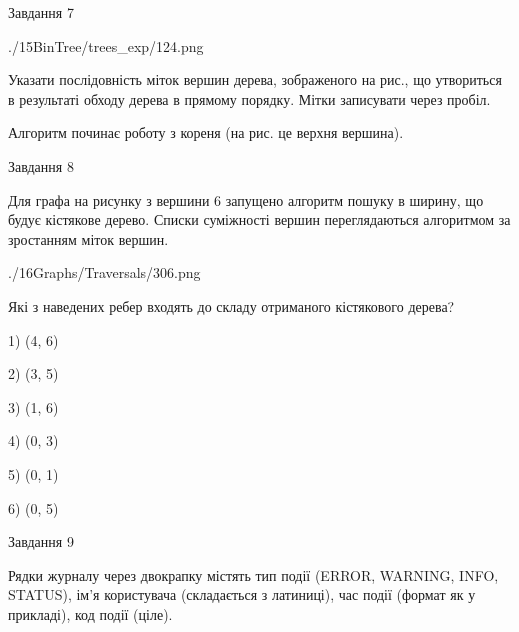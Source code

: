 \documentclass[12pt, ukrainian]{article}
\begin{document}
{\newpage
\begin{minipage}[t]{9.7cm}
               
{\begin{center}Завдання {7}\end{center}}
\vspace{-6mm}

\begin{center}
	{./15BinTree/trees_exp/124.png}
\end{center}
Указати послідовність міток вершин дерева, зображеного на рис., що утвориться в результаті обходу дерева в прямому порядку. Мітки записувати через пробіл.\par Алгоритм починає роботу з кореня (на рис. це верхня вершина).\par

\end{minipage}
\vline \hspace{8mm}
\begin{minipage}[t]{8.0cm}
               
{\begin{center}Завдання {8}\end{center}}
\vspace{-6mm}
Для графа на рисунку з вершини 6 запущено алгоритм пошуку в ширину, що будує кістякове дерево. Списки суміжності вершин переглядаються алгоритмом за зростанням міток вершин.\par
\begin{center}
	{./16Graphs/Traversals/306.png}
\end{center}
\par Які з наведених ребер входять до складу отриманого кістякового дерева?\par
1) (4, 6)\par
2) (3, 5)\par
3) (1, 6)\par
4) (0, 3)\par
5) (0, 1)\par
6) (0, 5)\par
{\vskip 15pt} \par

\end{minipage}

               
{\begin{center}Завдання {9}\end{center}}
\vspace{-6mm}
Рядки журналу через двокрапку містять тип події (ERROR, WARNING, INFO, STATUS), ім'я користувача (складається з латиниці), час події (фор\-мат як у прикладі), код події (ціле).

}
\end{document}
